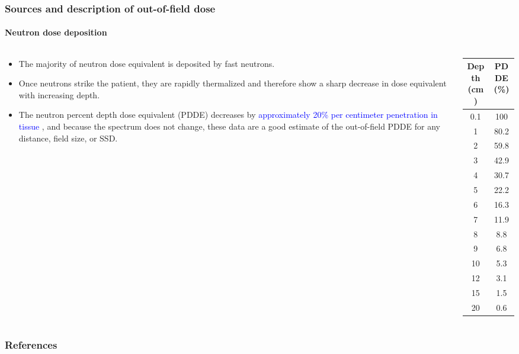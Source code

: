 \documentclass{beamer}
\begin{document}
\begin{frame}
  \frametitle{Sources and description of out-of-field dose  }
  \framesubtitle{Neutron dose deposition}
   \begin{columns}
    \begin{column}{0.6\textwidth}
      \begin{itemize}
        \justifying
        \item The majority of neutron dose equivalent is deposited by fast neutrons.
        \item Once neutrons strike the patient, they are rapidly thermalized and therefore show a sharp decrease in dose equivalent with increasing depth.
        \item The neutron percent depth dose equivalent (PDDE) decreases by \textcolor{blue}{approximately 20\% per centimeter penetration in tissue} \cite{kry_neutron_2009}, and because the spectrum does not change, these data are a good estimate of the out-of-field PDDE for any distance, field size, or SSD.
	\end{itemize}
    \end{column}
    \begin{column}{0.4\textwidth}
      \centering
      \begin{table}
        \centering
        \begin{tabular}{c | c}
          \hline\hline
          Depth (cm) & PDDE (\%) \\ \hline 
          0.1 & 100 \\
          1   & 80.2 \\
          2   & 59.8 \\
          3   & 42.9 \\
          4   & 30.7 \\
          5   & 22.2 \\
          6   & 16.3 \\
          7   & 11.9 \\
          8   & 8.8 \\
          9   & 6.8 \\
          10  & 5.3 \\
          12  & 3.1 \\
          15  & 1.5 \\
          20  & 0.6 \\ \hline \hline
        \end{tabular}
      \end{table}
    \end{column}
  \end{columns}
\end{frame}
























\begin{frame}[allowframebreaks]
    \frametitle{References}
    
    
\end{frame}
\end{document}
